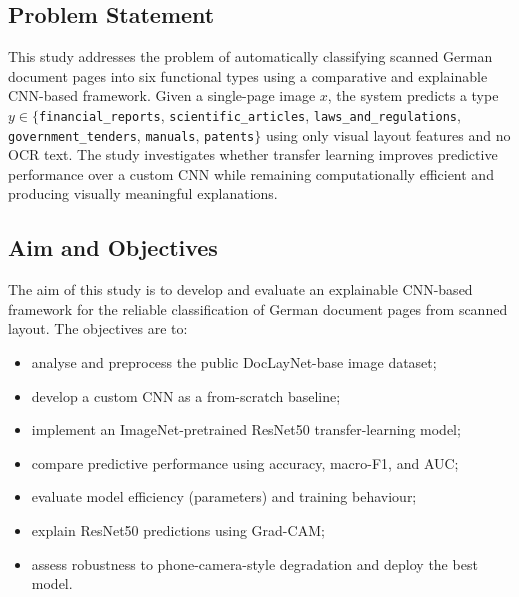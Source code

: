\documentclass[preprint,12pt]{elsarticle}
\begin{document}
\subsection{Problem Statement}
This study addresses the problem of automatically classifying scanned German
document pages into six functional types using a comparative and explainable
CNN-based framework.
Given a single-page image $x$, the system predicts a type
$y \in \{$\texttt{financial\_reports}, \texttt{scientific\_articles},
\texttt{laws\_and\_regulations}, \texttt{government\_tenders}, \texttt{manuals},
\texttt{patents}$\}$ using only visual layout features and no OCR text.
The study investigates whether transfer learning improves predictive
performance over a custom CNN while remaining computationally efficient and
producing visually meaningful explanations.

\subsection{Aim and Objectives}
The aim of this study is to develop and evaluate an explainable CNN-based
framework for the reliable classification of German document pages from scanned
layout.
The objectives are to:
\begin{itemize}
    \item analyse and preprocess the public DocLayNet-base image dataset;
    \item develop a custom CNN as a from-scratch baseline;
    \item implement an ImageNet-pretrained ResNet50 transfer-learning model;
    \item compare predictive performance using accuracy, macro-F1, and AUC;
    \item evaluate model efficiency (parameters) and training behaviour;
    \item explain ResNet50 predictions using Grad-CAM;
    \item assess robustness to phone-camera-style degradation and deploy the best model.
\end{itemize}
\end{document}
